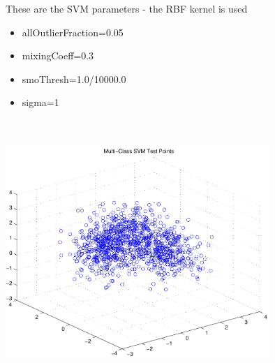 \documentclass[9pt]{article}
\theoremstyle{plain}
\theoremstyle{definition}
\theoremstyle{remark}
\numberwithin{equation}{section}
\begin{document}
These are the SVM parameters - the RBF kernel is used\begin{itemize}
\item allOutlierFraction=0.05
\item mixingCoeff=0.3
\item smoThresh=1.0/10000.0
\item sigma=1
\end{itemize}
\includegraphics[width=10.0cm,height=10.0cm]{testPoints.pdf}
\end{document}
